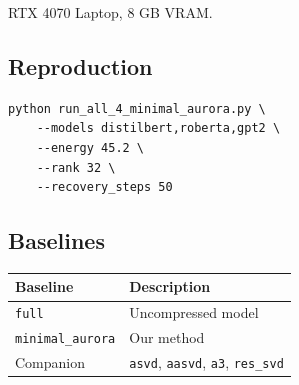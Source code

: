 RTX 4070 Laptop, 8 GB VRAM.

\subsection{Reproduction}

\begin{lstlisting}
python run_all_4_minimal_aurora.py \
    --models distilbert,roberta,gpt2 \
    --energy 45.2 \
    --rank 32 \
    --recovery_steps 50
\end{lstlisting}

\subsection{Baselines}

\begin{table}[H]
\centering
\small
\begin{tabular}{ll}
\toprule
\textbf{Baseline} & \textbf{Description} \\
\midrule
\texttt{full} & Uncompressed model \\
\texttt{minimal\_aurora} & Our method \\
Companion & \texttt{asvd}, \texttt{aasvd}, \texttt{a3}, \texttt{res\_svd} \\
\bottomrule
\end{tabular}
\end{table}

